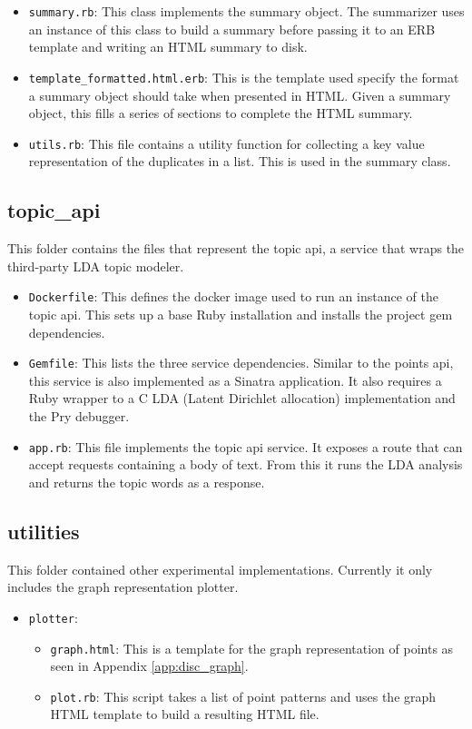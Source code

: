 \begin{itemize}
    \item
      \texttt{summary.rb}: This class implements the summary object. The summarizer uses an instance of this class to build a summary before passing it to an ERB template and writing an HTML summary to disk.
    \item
      \texttt{template\_formatted.html.erb}: This is the template used specify the format a summary object should take when presented in HTML. Given a summary object, this fills a series of sections to complete the HTML summary.
    \item
      \texttt{utils.rb}: This file contains a utility function for collecting a key value representation of the duplicates in a list. This is used in the summary class.
  \end{itemize}

\subsection*{topic\_api}
  This folder contains the files that represent the topic api, a service that wraps the third-party LDA topic modeler.
  \begin{itemize}
    \item
      \texttt{Dockerfile}: This defines the docker image used to run an instance of the topic api. This sets up a base Ruby installation and installs the project gem dependencies.
    \item
      \texttt{Gemfile}: This lists the three service dependencies. Similar to the points api, this service is also implemented as a Sinatra application. It also requires a Ruby wrapper to a C LDA (Latent Dirichlet allocation) implementation and the Pry debugger.
    \item
      \texttt{app.rb}: This file implements the topic api service. It exposes a route that can accept requests containing a body of text. From this it runs the LDA analysis and returns the topic words as a response.
  \end{itemize}

\subsection*{utilities}
  This folder contained other experimental implementations. Currently it only includes the graph representation plotter.

  \begin{itemize}
    \item
      \texttt{plotter}:

      \begin{itemize}
      \item
        \texttt{graph.html}: This is a template for the graph representation of points as seen in Appendix \ref{app:disc_graph}.
      \item
        \texttt{plot.rb}: This script takes a list of point patterns and uses the graph HTML template to build a resulting HTML file.
      \end{itemize}
  \end{itemize}
